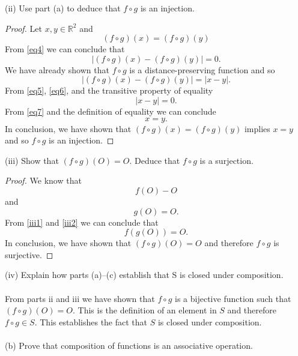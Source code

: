 \documentclass[11pt,a4paper]{article}
\begin{document}
(ii) Use part (a) to deduce that $f \circ g$ is an injection.\\

\begin{proof}
Let $x,y\in\mathbb{R}^2$ and
\begin{equation}\label{eq4}
(f\circ g)(x) = (f\circ g)(y)
\end{equation}
From \eqref{eq4} we can conclude that
\begin{equation}\label{eq5}
|(f\circ g)(x) - (f\circ g)(y)| = 0.
\end{equation}
We have already shown that $f\circ g$ is a distance-preserving function and so
\begin{equation}\label{eq6}
|(f\circ g)(x) - (f\circ g)(y)| = |x-y|.
\end{equation}
From \eqref{eq5}, \eqref{eq6}, and the transitive property of equality
\begin{equation}\label{eq7}
|x-y| = 0.
\end{equation}
From \eqref{eq7} and the definition of equality we can conclude
\[x=y.\]
In conclusion, we have shown that $(f\circ g)(x) = (f\circ g)(y)$ implies $x=y$ and so $f\circ g$ is an injection.
\end{proof}

(iii) Show that $(f \circ g)(O) = O$. Deduce that $f \circ g$ is a surjection.

\begin{proof}
We know that
\begin{equation}\label{iii1}
f(O) - O
\end{equation}
and
\begin{equation}\label{iii2}
g(O) = O.
\end{equation}
From \eqref{iii1} and \eqref{iii2} we can conclude that
\[f(g(O)) = O.\]
In conclusion, we have shown that $(f\circ g)(O) = O$ and therefore $f\circ g$ is surjective.

\end{proof}

(iv) Explain how parts (a)–(c) establish that S is closed under composition.\\
~\\
From parts ii and iii we have shown that $f\circ g$ is a bijective function such that $(f\circ g)(O) = O$. This is the definition of an element in $S$ and therefore $f\circ g\in S$. This establishes the fact that $S$ is closed under composition.\\
~\\
(b) Prove that composition of functions is an associative operation.
\end{document}
